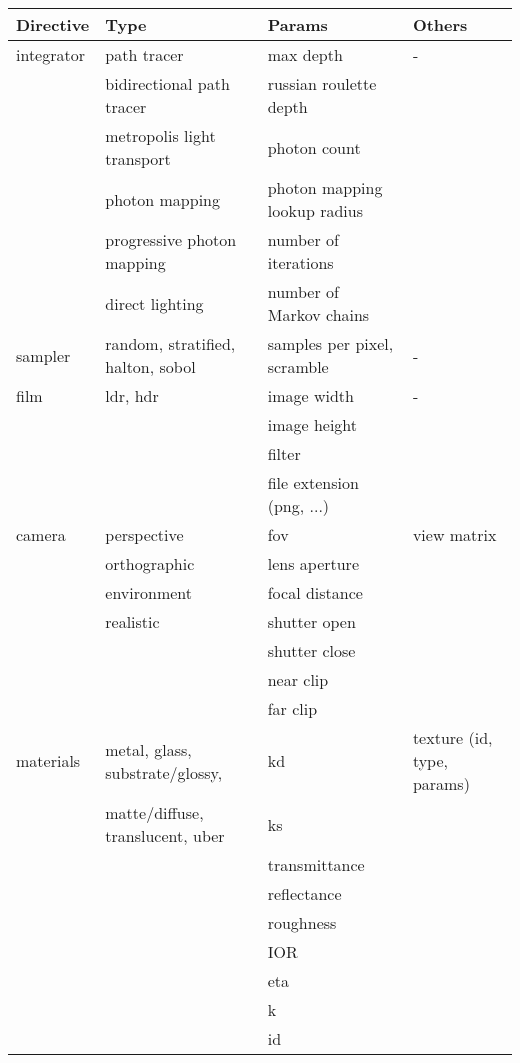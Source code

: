 \scriptsize
\begin{center}
    \begin{tabular}{ l | l | l | l }
    \hline
    Directive 		& Type 				& Params 			& Others		\\ 
    \hline
    integrator		& path tracer 			& max depth 			& -			\\
			& bidirectional path tracer 	& russian roulette depth	&			\\
			& metropolis light transport	& photon count			&			\\
			& photon mapping		& photon mapping lookup radius	&			\\
			& progressive photon mapping	& number of iterations		&			\\
			& direct lighting		& number of Markov chains	&			\\ 
			\hline
    sampler	& random, stratified, halton, sobol & samples per pixel, scramble		& -			\\
			\hline
    film		& ldr, hdr				& image width			& -			\\
			& 				& image height			&			\\
			&				& filter			&			\\
			&				& file extension (png, ...) 	&			\\ 
			\hline
    camera		& perspective			& fov				& view matrix		\\
			& orthographic			& lens aperture		&			\\
			& environment			& focal distance		&			\\
			& realistic			& shutter open			&			\\
			&				& shutter close			&			\\
			&				& near clip			&			\\
			&				& far clip			&			\\ 
			\hline
    materials		& metal, glass, substrate/glossy, & kd				& texture (id, type, params)	\\ 
			& matte/diffuse, translucent, uber		  & ks				&			\\
			&  										  & transmittance			&			\\
			&  										  & reflectance			&			\\
			&  										  & roughness			&			\\
			&  			& IOR				&			\\
			&				& eta				&			\\
			&				& k				&			\\
			& 				& id				&			\\

\end{tabular}
\end{center}
